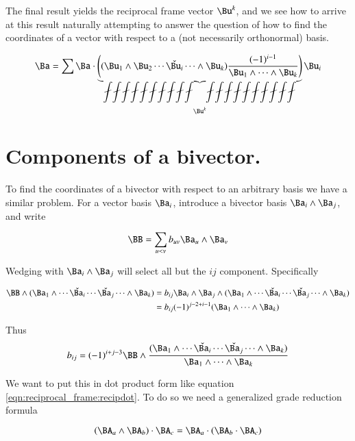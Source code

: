 The final result yields the reciprocal frame vector $\Bu^k$, and we see how to arrive at this result naturally attempting
to answer the question of how to find the coordinates of a vector with respect to a (not necessarily orthonormal) basis.

\begin{equation}\label{eqn:reciprocal_frame:recipdot}
\Ba =
\sum
\Ba \cdot 
\underbrace{
\left((\Bu_1 \wedge \Bu_2 \cdots \check{\Bu_i} \cdots \wedge \Bu_k) \frac{ (-1)^{i-1} }{ \Bu_1 \wedge \cdots \wedge \Bu_k }\right) 
}_{\Bu^k}
\Bu_i
\end{equation}

\section{Components of a bivector. }

To find the coordinates of a bivector with respect to an arbitrary basis we have a similar problem.
For a vector basis ${\Ba_i}$, introduce a bivector basis ${\Ba_i \wedge \Ba_j}$, and write

\begin{equation}\label{eqn:reciprocal_frame:bivectorcoord}
\BB = \sum_{u<v} b_{uv} \Ba_u \wedge \Ba_v
\end{equation}

Wedging with $\Ba_i \wedge \Ba_j$ will select all but the $ij$ component.  Specifically

\begin{align*}
\BB \wedge 
(\Ba_1 \wedge \cdots \check{\Ba_i} \cdots \check{\Ba_j} \cdots \wedge \Ba_k) 
&= b_{ij} \Ba_i \wedge \Ba_j \wedge (\Ba_1 \wedge \cdots \check{\Ba_i} \cdots \check{\Ba_j} \cdots \wedge \Ba_k)  \\
&= b_{ij} (-1)^{j-2 + i-1}(\Ba_1 \wedge \cdots \wedge \Ba_k) \\
\end{align*}

Thus 
\begin{equation}\label{eqn:reciprocal_frame:bivectorrecip}
b_{ij} = (-1)^{i+j-3}\BB \wedge
\frac{ (\Ba_1 \wedge \cdots \check{\Ba_i} \cdots \check{\Ba_j} \cdots \wedge \Ba_k) }
{\Ba_1 \wedge \cdots \wedge \Ba_k}
\end{equation}

We want to put this in dot product form like equation \ref{eqn:reciprocal_frame:recipdot}.  To do so we need a generalized grade reduction formula

\begin{equation}\label{eqn:reciprocal_frame:gradereduction}
(\BA_a \wedge \BA_b) \cdot \BA_c = \BA_a \cdot (\BA_b \cdot \BA_c)
\end{equation}

